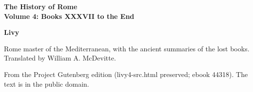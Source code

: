 \documentclass[11pt,letterpaper]{article}
\begin{document}
\color{ink}

\begin{titlepage}
\centering
\vspace*{4em}
{\LARGE\bfseries\color{heading} The History of Rome\\[0.3em]Volume 4: Books XXXVII to the End\par}
\vspace{2em}
{\Large\bfseries\color{heading} Livy\par}
\vspace{2.5em}
{\itshape\color{subhead}\parbox{0.8\linewidth}{\centering Rome master of the Mediterranean, with the ancient summaries of the lost books. Translated by William A. McDevitte.\par}}
\vfill
{\small From the Project Gutenberg edition (livy4-src.html preserved; ebook 44318). The text is in the public domain.\par}
\vspace{2em}
\end{titlepage}

\tableofcontents


\end{document}
